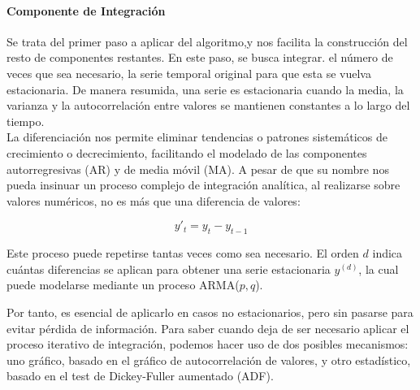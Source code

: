 \paragraph{Componente de Integración}


Se trata del primer paso a aplicar del algoritmo,y nos facilita la construcción del resto de componentes restantes. En este paso, se busca integrar. el número de veces que sea necesario, la serie temporal original para que esta se vuelva estacionaria. De manera resumida, una serie es estacionaria cuando la media, la varianza y la autocorrelación entre valores se mantienen constantes a lo largo del tiempo.\\

La diferenciación nos permite eliminar tendencias o patrones sistemáticos de crecimiento o decrecimiento, facilitando el modelado de las componentes autorregresivas (AR) y de media móvil (MA). A pesar de que su nombre nos pueda insinuar un proceso complejo de integración analítica, al realizarse sobre valores numéricos, no es más que una diferencia de valores:

\[
    y'_t = y_t - y_{t-1}
\]

Este proceso puede repetirse tantas veces como sea necesario. El orden \( d \) indica cuántas diferencias se aplican para obtener una serie estacionaria \( y^{(d)} \), la cual puede modelarse mediante un proceso ARMA(\(p,q\)).

Por tanto, es esencial de aplicarlo en casos no estacionarios, pero sin pasarse para evitar pérdida de información. Para saber cuando deja de ser necesario aplicar el proceso iterativo de integración, podemos hacer uso de dos posibles mecanismos: uno gráfico, basado en el gráfico de autocorrelación de valores, y otro estadístico, basado en el test de Dickey-Fuller aumentado (ADF).

